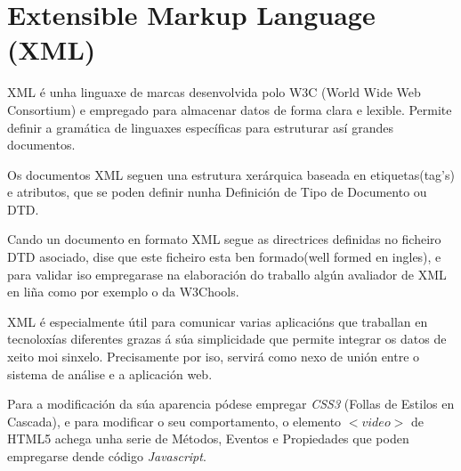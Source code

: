 \section{Extensible Markup Language (XML)}
    XML é unha linguaxe de marcas desenvolvida polo W3C (World Wide Web Consortium) e empregado
    para almacenar datos de forma clara e lexible. Permite definir a gramática de linguaxes 
    específicas para estruturar así grandes documentos.
    
    Os documentos XML seguen una estrutura xerárquica baseada en etiquetas(tag's) e atributos,
    que se poden definir nunha Definición de Tipo de Documento ou DTD. \cite{dtd-web-page}
    
    Cando un documento en formato XML segue as directrices definidas no ficheiro DTD asociado,
    dise que este ficheiro esta ben formado(well formed en ingles), e para validar iso empregarase
    na elaboración do traballo algún avaliador de XML en liña como por exemplo o da W3Chools.\cite{xml-validator}
    
    XML é especialmente útil para comunicar varias aplicacións que traballan en tecnoloxías 
    diferentes grazas á súa simplicidade que permite integrar os datos de xeito moi sinxelo. Precisamente
    por iso, servirá como nexo de unión entre o sistema de análise e a aplicación web. 
        
        
    Para a modificación da súa aparencia pódese empregar \emph{CSS3} (Follas de Estilos en 
    Cascada), e para modificar o seu comportamento, o elemento $<video>$ de HTML5 achega
    unha serie de Métodos, Eventos e Propiedades\cite{w3school-video-events} que poden
    empregarse dende código \emph{Javascript}.
    

